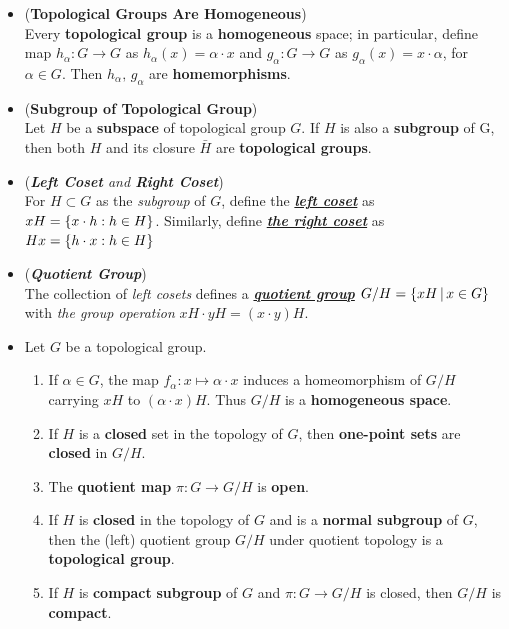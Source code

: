 \documentclass[11pt]{article}
\begin{document}
\begin{itemize}
\item \begin{proposition} (\textbf{Topological Groups Are Homogeneous})\\
Every \textbf{topological group} is a \textbf{homogeneous} space; in particular, define map $h_{\alpha}: G\to G$ as $h_{\alpha}(x) = \alpha\cdot x$ and $g_{\alpha}: G\to G$ as $g_{\alpha}(x) = x \cdot \alpha$, for $\alpha\in G$. Then $h_{\alpha}, \, g_{\alpha}$ are \textbf{homemorphisms}.
\end{proposition}

\item \begin{proposition} (\textbf{Subgroup of Topological Group})\\
Let $H$ be a \textbf{subspace} of topological group $G$. If $H$ is also a \textbf{subgroup} of G, then both $H$ and its closure $\bar{H}$ are \textbf{topological groups}.
\end{proposition}

\item \begin{definition} (\emph{\textbf{Left Coset} and \textbf{Right Coset}})\\
For $H\subset G$ as the \emph{subgroup} of $G$, define the \underline{\emph{\textbf{left coset}}} as $xH = \left\{x\cdot h: h\in H\right\}$. Similarly, define \underline{\emph{\textbf{the right coset}}} as $Hx = \left\{h\cdot x: h\in H\right\}$
\end{definition}

\item \begin{definition} (\emph{\textbf{Quotient Group}})\\
The collection of \emph{left cosets} defines a \underline{\emph{\textbf{quotient group}}} $G/H = \left\{ xH\, |\, x\in G\right\}$ with \emph{the group operation} $xH \cdot yH = (x\cdot y) H$.  
\end{definition}

\item \begin{proposition}
Let $G$ be a topological group.
\begin{enumerate}
\item If $\alpha \in G$, the map $f_\alpha: x \mapsto \alpha \cdot x$  induces a homeomorphism of $G/H$ carrying $xH$ to $(\alpha \cdot x)H$. Thus  $G/H$ is a \textbf{homogeneous space}.
\item If $H$ is a \textbf{closed} set in the topology of $G$, then \textbf{one-point sets} are \textbf{closed} in $G/H$.
\item The \textbf{quotient map} $\pi: G \rightarrow G/H$ is \textbf{open}.
\item If $H$ is \textbf{closed} in the topology of $G$ and is a \textbf{normal subgroup} of $G$, then the (left) quotient group $G/H$ under quotient topology is a \textbf{topological group}. 
\item If $H$ is \textbf{compact} \textbf{subgroup} of $G$ and $\pi: G \rightarrow G/H$ is closed, then $G/H$ is \textbf{compact}.
\end{enumerate}
\end{proposition}


\end{itemize}
\end{document}
